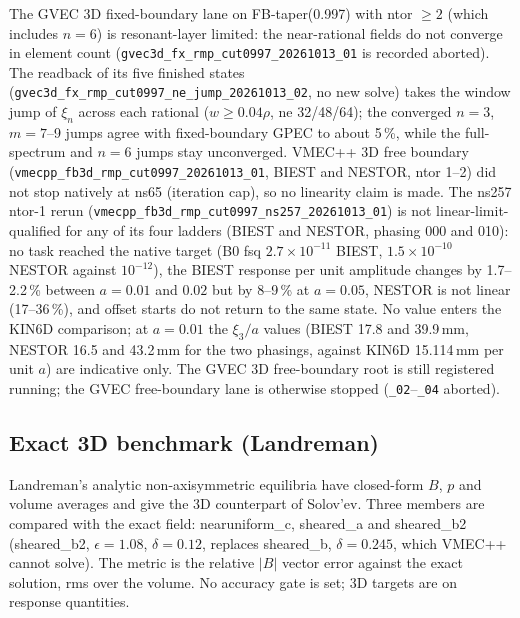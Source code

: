 The GVEC 3D fixed-boundary lane on FB-taper(0.997) with ntor $\ge2$ (which includes
$n=6$) is resonant-layer limited: the near-rational fields do not converge in element count
(\texttt{gvec3d\_fx\_rmp\_cut0997\_20261013\_01} is recorded aborted). The readback of its five
finished states (\texttt{gvec3d\_fx\_rmp\_cut0997\_ne\_jump\_20261013\_02}, no new solve) takes
the window jump of $\xi_n$ across each rational ($w\ge0.04\rho$, ne 32/48/64); the converged
$n=3$, $m=7$--9 jumps agree with fixed-boundary GPEC to about 5\,\%, while the full-spectrum
and $n=6$ jumps stay unconverged. VMEC++ 3D free boundary
(\texttt{vmecpp\_fb3d\_rmp\_cut0997\_20261013\_01}, BIEST and NESTOR, ntor 1--2) did not stop
natively at ns65 (iteration cap), so no linearity claim is made. The ns257 ntor-1 rerun
(\texttt{vmecpp\_fb3d\_rmp\_cut0997\_ns257\_20261013\_01}) is not linear-limit-qualified for any
of its four ladders (BIEST and NESTOR, phasing 000 and 010): no task reached the native target (B0 fsq
$2.7\times10^{-11}$ BIEST, $1.5\times10^{-10}$ NESTOR against $10^{-12}$), the BIEST response per unit
amplitude changes by 1.7--2.2\,\% between $a=0.01$ and $0.02$ but by 8--9\,\% at $a=0.05$, NESTOR is not
linear (17--36\,\%), and offset starts do not return to the same state. No value enters the KIN6D comparison;
at $a=0.01$ the $\xi_3/a$ values (BIEST 17.8 and 39.9\,mm, NESTOR 16.5 and 43.2\,mm for the two
phasings, against KIN6D 15.114\,mm per unit $a$) are indicative only. The GVEC 3D
free-boundary root  is still registered
running; the GVEC free-boundary lane is otherwise stopped (\texttt{\_02}--\texttt{\_04} aborted).

\subsection*{Exact 3D benchmark (Landreman)}
Landreman's analytic non-axisymmetric equilibria have closed-form $B$, $p$ and volume
averages and give the 3D counterpart of Solov'ev. Three members are compared with the
exact field: nearuniform\_c, sheared\_a and sheared\_b2 (sheared\_b2, $\epsilon=1.08$,
$\delta=0.12$, replaces sheared\_b, $\delta=0.245$, which VMEC++ cannot solve). The
metric is the relative $|B|$ vector error against the exact solution, rms over the volume.
No accuracy gate is set; 3D targets are on response quantities.

